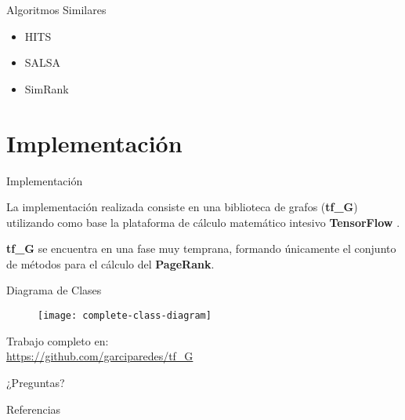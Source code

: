 \documentclass[12pt]{beamer}
\begin{document}
    \begin{frame}[fragile]{Algoritmos Similares}

      \begin{itemize}
        \item HITS \cite{kleinberg1999authoritative}
        \item SALSA \cite{lempel2001salsa}
        \item SimRank \cite{jeh2002simrank}
      \end{itemize}

    \end{frame}

  \section{Implementación}


    \begin{frame}[fragile]{Implementación}

      La implementación realizada consiste en una biblioteca de grafos (\textbf{tf\_G}) utilizando como base la plataforma de cálculo matemático intesivo \textbf{TensorFlow} \cite{abadi2016tensorflow}.

      \textbf{tf\_G} se encuentra en una fase muy temprana, formando únicamente el conjunto de métodos para el cálculo del \textbf{PageRank}.

    \end{frame}

    \begin{frame}[fragile]{Diagrama de Clases}

      \begin{figure}
        \texttt{[image: complete-class-diagram]}
        \caption{}
        \label{}
      \end{figure}

    \end{frame}


    \begin{frame}[standout]
      Trabajo completo en: \\
      \small\url{https://github.com/garciparedes/tf_G}
    \end{frame}

  \begin{frame}[standout]
    ¿Preguntas?
  \end{frame}


  \begin{frame}[allowframebreaks]{Referencias}

    
    

  \end{frame}
\end{document}
